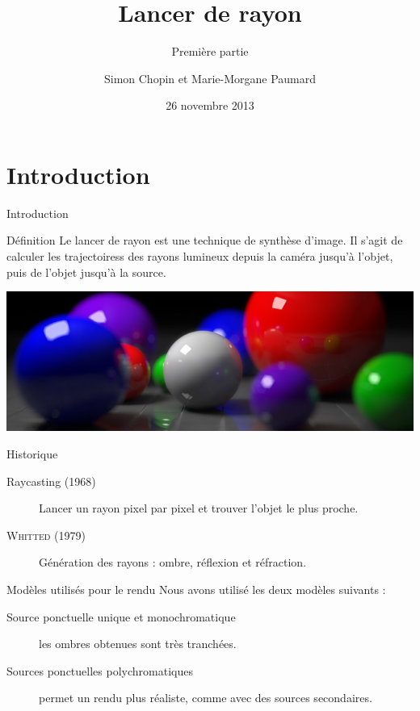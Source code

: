 \documentclass{beamer}
\title{Lancer de rayon}
\subtitle{Première partie}
\author{Simon Chopin et Marie-Morgane Paumard}
\date{26 novembre 2013}
\begin{document}
\begin{frame}
	\titlepage
\end{frame}

\section{Introduction}

\begin{frame}{Introduction}
\begin{alertblock}{Définition}
Le lancer de rayon est une technique de synthèse d'image. Il s'agit de calculer
les trajectoiress des rayons lumineux depuis la caméra jusqu'à l'objet, puis de
l'objet jusqu'à la source.
\end{alertblock}

\begin{center}
  \includegraphics[scale=0.2]{img/intro.jpg}
\end{center}

\begin{block}{Historique}
  \begin{description}
    \item[Raycasting (1968)] Lancer un rayon pixel par pixel et trouver l'objet
le plus proche.
    \item[\textsc{Whitted} (1979)] Génération des rayons : ombre, réflexion et
réfraction.
  \end{description}
\end{block}

\end{frame}

\begin{frame}{Modèles utilisés pour le rendu}
Nous avons utilisé les deux modèles suivants :
\begin{description}
  \item [Source ponctuelle unique et monochromatique] les ombres obtenues sont
très tranchées.
  \item [Sources ponctuelles polychromatiques] permet un rendu plus réaliste,
comme avec des sources secondaires.
\end{description}
\end{frame}
\end{document}
